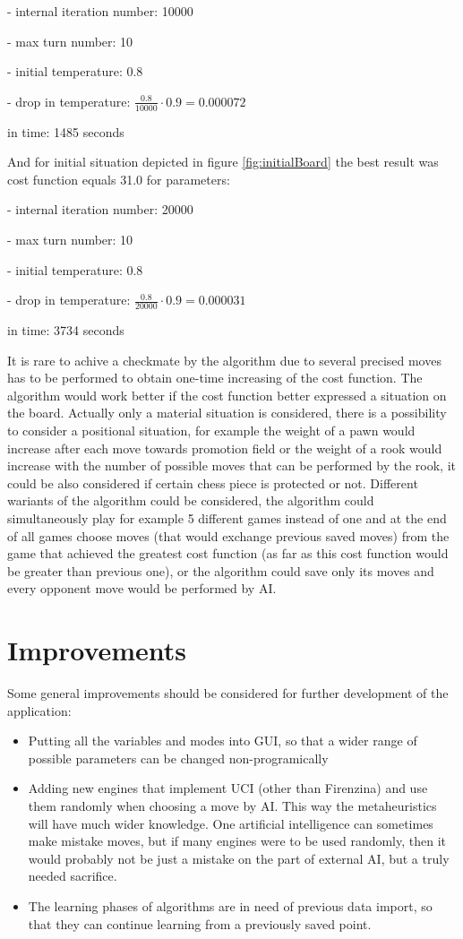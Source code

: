 \documentclass[pdftex]{article}
\begin{document}
- internal iteration number: 10000

- max turn number: 10

- initial temperature: 0.8

- drop in temperature: $\frac{0.8}{10000} \cdot 0.9 = 0.000072$

in time: 1485 seconds

And for initial situation depicted in figure \ref{fig:initialBoard} the best result was cost function equals 31.0 for parameters:

- internal iteration number: 20000

- max turn number: 10

- initial temperature: 0.8

- drop in temperature: $\frac{0.8}{20000} \cdot 0.9 = 0.000031$

in time: 3734 seconds

It is rare to achive a checkmate by the algorithm due to several precised moves has to be performed to obtain one-time increasing of the cost function. The algorithm would work better if the cost function better expressed a situation on the board. Actually only a material situation is considered, there is a possibility to consider a positional situation, for example the weight of a pawn would increase after each move towards promotion field or the weight of a rook would increase with the number of possible moves that can be performed by the rook, it could be also considered if certain chess piece is protected or not. Different wariants of the algorithm could be considered, the algorithm could simultaneously play for example 5 different games instead of one and at the end of all games choose moves (that would exchange previous saved moves) from the game that achieved the greatest cost function (as far as this cost function would be greater than previous one), or the algorithm could save only its moves and every opponent move would be performed by AI.

\section{Improvements}
\label{sec:improvements}

Some general improvements should be considered for further development of the application:
\begin{itemize}
 	\item Putting all the variables and modes into GUI, so that a wider range of possible parameters can be changed non-programically 
 	\item Adding new engines that implement UCI (other than Firenzina) and use them randomly when choosing a move by AI. This way the metaheuristics will have much wider knowledge. One artificial intelligence can sometimes make mistake moves, but if many engines were to be used randomly, then it would probably not be just a mistake on the part of external AI, but a truly needed sacrifice.
 	\item The learning phases of algorithms are in need of previous data import, so that they can continue learning from a previously saved point.
\end{itemize}
\end{document}
